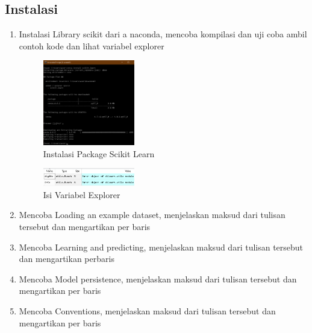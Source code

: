 \subsection{Instalasi}
\begin{enumerate}
	\item Instalasi Library scikit dari a naconda, mencoba kompilasi dan uji coba ambil contoh kode dan lihat variabel explorer
	\hfill\break
	\begin{figure}[H]
		\includegraphics[width=4cm]{figures/1174079/1/1.png}
		\centering
		\caption{Instalasi Package Scikit Learn}
	\end{figure}
	\begin{figure}[H]
		\includegraphics[width=4cm]{figures/1174079/1/2.png}
		\centering
		\caption{Isi Variabel Explorer}
	\end{figure}
	\item Mencoba Loading an example dataset, menjelaskan maksud dari tulisan tersebut dan mengartikan per baris
	\hfill\break
	
	\item Mencoba Learning and predicting, menjelaskan maksud dari tulisan tersebut dan mengartikan perbaris
	\hfill\break
	
	\item  Mencoba Model persistence, menjelaskan maksud dari tulisan tersebut dan mengartikan per baris
	\hfill\break
	
	\item Mencoba Conventions, menjelaskan maksud dari tulisan tersebut dan mengartikan per baris
	\hfill\break
	
\end{enumerate}

